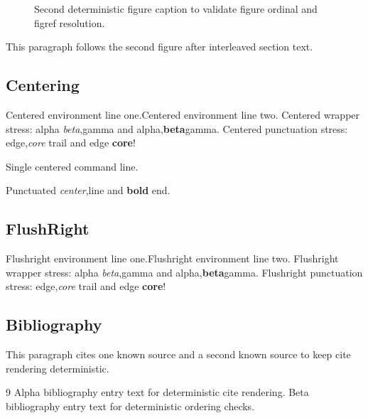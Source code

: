 \documentclass{article}
\begin{document}
\begin{figure}
\caption{Second deterministic figure caption to validate figure ordinal and figref resolution.}
\end{figure}
This paragraph follows the second figure after interleaved section text.

\subsection{Centering}
\begin{center}
Centered environment line one.\linebreak Centered environment line two.
Centered wrapper stress: alpha \emph{beta},gamma and alpha,\textbf{beta}gamma.
Centered punctuation stress: edge,\emph{core} trail and edge \textbf{core}!
\end{center}
\centerline{Single centered command line.}
\centerline{Punctuated \emph{center},line and \textbf{bold} end.}

\subsection{FlushRight}
\begin{flushright}
Flushright environment line one.\linebreak Flushright environment line two.
Flushright wrapper stress: alpha \emph{beta},gamma and alpha,\textbf{beta}gamma.
Flushright punctuation stress: edge,\emph{core} trail and edge \textbf{core}!
\end{flushright}

\subsection{Bibliography}
This paragraph cites one known source \cite{ref:alpha} and a second known source \cite{ref:beta} to keep cite rendering deterministic.

\begin{thebibliography}{9}
Alpha bibliography entry text for deterministic cite rendering.
Beta bibliography entry text for deterministic ordering checks.
\end{thebibliography}
\end{document}
